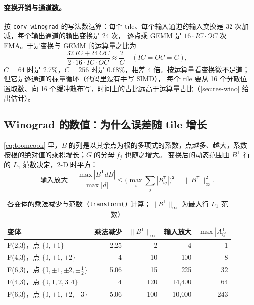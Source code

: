 \documentclass[11pt,a4paper]{ctexart}
\begin{document}
\paragraph{变换开销与通道数。} 按 \texttt{conv\_winograd} 的写法数运算：每个 tile、每个输入通道的输入变换是 32 次加减，每个输出通道的输出变换是 24 次，
逐点乘 GEMM 是 $16\cdot IC\cdot OC$ 次 FMA。于是变换与 GEMM 的运算量之比为
\begin{equation}
  \frac{32\,IC + 24\,OC}{2\cdot16\cdot IC\cdot OC} \approx \frac{2}{C}\quad(IC = OC = C),\label{eq:txratio}
\end{equation}
$C = 64$ 时是 2.7\%，$C = 256$ 时是 0.68\%，相差 4 倍。按运算量看变换微不足道；但它是逐通道的标量循环（代码里没有手写 SIMD），
每个 tile 要从 16 个分散位置取数、向 16 个缓冲散布写，时间上的占比远高于运算量占比（\cref{sec:res-wino} 给出估计）。

\subsection{Winograd 的数值：为什么误差随 tile 增长}\label{sec:numerics-theory}

\cref{eq:toomcook} 里，$B$ 的列是以其余点为根的多项式的系数，点越多、越大，系数按根的绝对值的乘积增长；$G$ 的分母 $f_j$ 也随之增大。
变换后的动态范围由 $B^{\mathsf T}$ 行的 $L_1$ 范数决定，2-D 时平方：
\begin{equation}
  \text{输入放大} = \frac{\max|B^{\mathsf T}dB|}{\max|d|} \le \Big(\max_i \sum_j |B^{\mathsf T}_{ij}|\Big)^2 = \|B^{\mathsf T}\|_\infty^2.\label{eq:growth}
\end{equation}

\begin{table}[H]
\centering\small
\caption{各变体的乘法减少与范数（\texttt{transform()} 计算；$\|B^{\mathsf T}\|_\infty$ 为最大行 $L_1$ 范数）}\label{tab:norms}
\begin{tabular}{lrrrr}
\toprule
变体 & 乘法减少 & $\|B^{\mathsf T}\|_\infty$ & 输入放大 & $\max|A^{\mathsf T}_{ij}|$ \\
\midrule
F(2,3)，点 $\{0,\pm1\}$ & 2.25 & 2 & 4 & 1 \\
F(4,3)，点 $\{0,\pm1,\pm2\}$ & 4 & 10 & 100 & 8 \\
F(6,3)，点 $\{0,\pm1,\pm2,\pm\tfrac12\}$ & 5.06 & 15 & 225 & 32 \\
F(4,3)，点 $\{0,1,2,3,4\}$ & 4 & 120 & 14,400 & 64 \\
F(6,3)，点 $\{0,\pm1,\pm2,\pm3\}$ & 5.06 & 100 & 10,000 & 243 \\
\bottomrule
\end{tabular}
\end{table}
\end{document}

